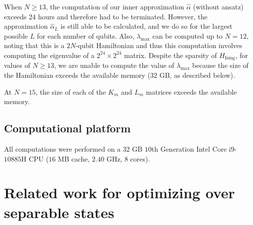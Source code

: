 When $N \geq 13$, the computation of our inner approximation $\hat{\alpha}$ (without ansatz) exceeds $24$ hours and therefore had to be terminated. 
However, the approximation $\hat{\alpha}_L$ is still able to be calculated, and we do so for the largest possible $L$ for each number of qubits. 
Also, $\lambda_{\max}$ can be computed up to $N = 12$, noting that this is a $2N$-qubit Hamiltonian and thus  
this computation involves computing the eigenvalue of a $2^{24} \times 2^{24}$ matrix. 
Despite the sparsity of $H_{\mathrm{Ising}}$, for values of $N \geq 13$, we are unable to compute the value of $\lambda_{\max}$ because the size of the Hamiltonian exceeds the available memory ($32$ GB, as described below).  

At $N = 15$, the size of each of the $K_m$ and $L_m$ matrices exceeds the available memory. 

\subsection*{Computational platform}\label{sec:ch2_SEP-platform}

All computations were performed on a $32$ GB $10$th Generation Intel Core i$9$-$10885$H CPU ($16$ MB cache, $2.40$ GHz, $8$ cores).

\section{Related work for optimizing over separable states} \label{sec:ch2_SEP-SEP_related} 

